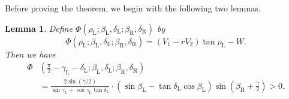 \documentclass[11pt]{amsart}
\newtheorem{lemma}[theorem]{Lemma}
\numberwithin{equation}{section}
\numberwithin{theorem}{section}
\newcommand{\Lt}{\ensuremath{\mathrm{L}}}
\newcommand{\Rt}{\ensuremath{\mathrm{R}}}
\begin{document}
Before proving the theorem, we begin with the following two lemmas.
\begin{lemma}\label{lem:Phi>0}
Define $\Phi (\rho_\Lt ;\beta_\Lt ,\delta_\Lt ;\beta_\Rt ,\delta_\Rt )$ by
\begin{equation*}
\Phi (\rho_\Lt ;\beta_\Lt ,\delta_\Lt ;\beta_\Rt ,\delta_\Rt )=(V_1-rV_2)\tan\rho_\Lt -W.
\end{equation*}
Then we have 
\begin{equation}\label{eq:Phi_L}
\begin{aligned}
\Phi&\left(\frac{\pi}{2}-\gamma_\Lt -\delta_\Lt;\beta_\Lt ,\delta_\Lt ;\beta_\Rt ,\delta_\Rt\right)\\
&=\frac{2\sin (\gamma /2)}{\sin\gamma_\Lt +\cos\gamma_\Lt\tan\delta_\Lt}
\cdot (\sin\beta_\Lt -\tan\delta_\Lt\cos\beta_\Lt )\sin\left(\beta_\Rt +\frac{\gamma}{2}\right) >0.
\end{aligned}
\end{equation}
\end{lemma}
\end{document}
